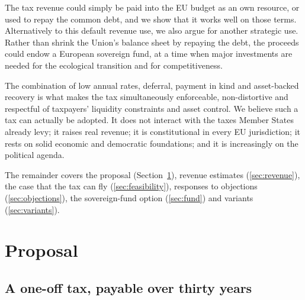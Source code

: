 \documentclass[../../main]{subfiles}
\begin{document}
The tax revenue could simply be paid into the EU budget as an own resource, or used to repay the common debt, and we show that it works well on those terms. %
Alternatively to this default revenue use, we also argue for %
another strategic use. Rather than shrink the Union's balance sheet by repaying the debt, the proceeds could endow a European sovereign fund, at a time when major investments are needed for the ecological transition and for competitiveness. %

The combination of low annual rates, deferral, payment in kind and asset-backed recovery is what makes the tax simultaneously enforceable, non-distortive and respectful of taxpayers' liquidity constraints and asset control.
We believe such a tax can actually be adopted. It does not interact with the taxes Member States already levy; it raises real revenue; %
it is constitutional in every EU jurisdiction; it rests on solid economic and democratic foundations; and it is increasingly on the political agenda.

The remainder covers the proposal (Section~\ref{sec:proposal}), revenue estimates (\ref{sec:revenue}), the case that the tax can fly (\ref{sec:feasibility}), responses to objections (\ref{sec:objections}), the sovereign-fund option (\ref{sec:fund}) and variants (\ref{sec:variants}).

\section{Proposal}
\label{sec:proposal}

\subsection{A one-off tax, payable over thirty years}
\end{document}

